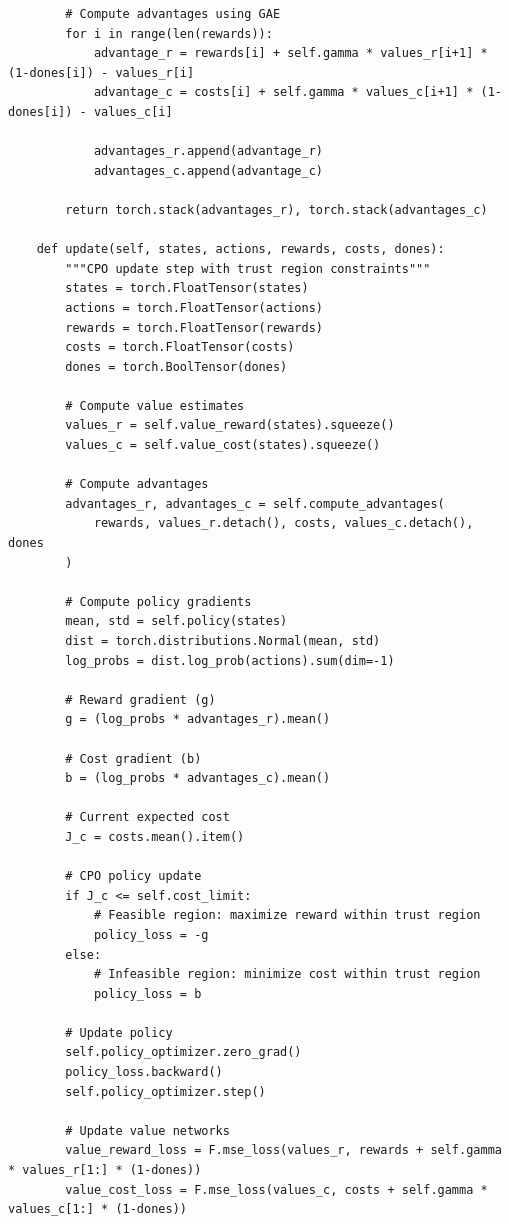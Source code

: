 \documentclass[12pt]{article}
\begin{document}
{{{{\begin{verbatim}
        # Compute advantages using GAE
        for i in range(len(rewards)):
            advantage_r = rewards[i] + self.gamma * values_r[i+1] * (1-dones[i]) - values_r[i]
            advantage_c = costs[i] + self.gamma * values_c[i+1] * (1-dones[i]) - values_c[i]
            
            advantages_r.append(advantage_r)
            advantages_c.append(advantage_c)
        
        return torch.stack(advantages_r), torch.stack(advantages_c)
    
    def update(self, states, actions, rewards, costs, dones):
        """CPO update step with trust region constraints"""
        states = torch.FloatTensor(states)
        actions = torch.FloatTensor(actions)
        rewards = torch.FloatTensor(rewards)
        costs = torch.FloatTensor(costs)
        dones = torch.BoolTensor(dones)
        
        # Compute value estimates
        values_r = self.value_reward(states).squeeze()
        values_c = self.value_cost(states).squeeze()
        
        # Compute advantages
        advantages_r, advantages_c = self.compute_advantages(
            rewards, values_r.detach(), costs, values_c.detach(), dones
        )
        
        # Compute policy gradients
        mean, std = self.policy(states)
        dist = torch.distributions.Normal(mean, std)
        log_probs = dist.log_prob(actions).sum(dim=-1)
        
        # Reward gradient (g)
        g = (log_probs * advantages_r).mean()
        
        # Cost gradient (b)
        b = (log_probs * advantages_c).mean()
        
        # Current expected cost
        J_c = costs.mean().item()
        
        # CPO policy update
        if J_c <= self.cost_limit:
            # Feasible region: maximize reward within trust region
            policy_loss = -g
        else:
            # Infeasible region: minimize cost within trust region
            policy_loss = b
        
        # Update policy
        self.policy_optimizer.zero_grad()
        policy_loss.backward()
        self.policy_optimizer.step()
        
        # Update value networks
        value_reward_loss = F.mse_loss(values_r, rewards + self.gamma * values_r[1:] * (1-dones))
        value_cost_loss = F.mse_loss(values_c, costs + self.gamma * values_c[1:] * (1-dones))
        

\end{verbatim}}}}}
\end{document}
